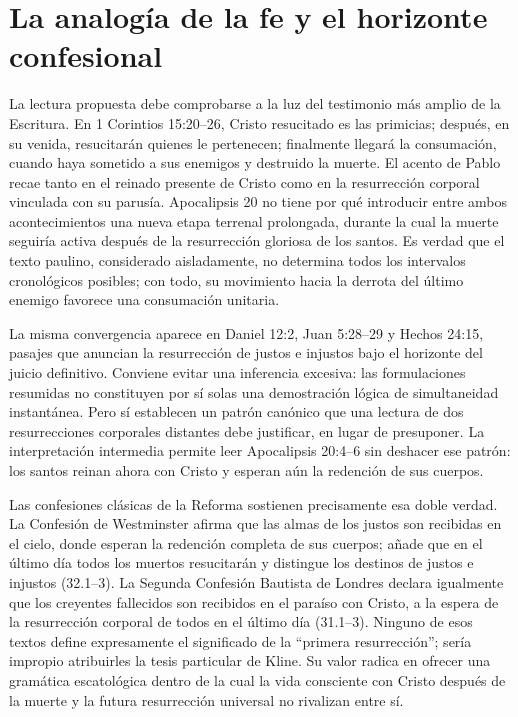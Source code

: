 \section{La analogía de la fe y el horizonte confesional}

La lectura propuesta debe comprobarse a la luz del testimonio más amplio de la Escritura.
En 1 Corintios 15:20--26, Cristo resucitado es las primicias; después, en su venida, resucitarán quienes le pertenecen; finalmente llegará la consumación, cuando haya sometido a sus enemigos y destruido la muerte.
El acento de Pablo recae tanto en el reinado presente de Cristo como en la resurrección corporal vinculada con su parusía.
Apocalipsis 20 no tiene por qué introducir entre ambos acontecimientos una nueva etapa terrenal prolongada, durante la cual la muerte seguiría activa después de la resurrección gloriosa de los santos.
Es verdad que el texto paulino, considerado aisladamente, no determina todos los intervalos cronológicos posibles; con todo, su movimiento hacia la derrota del último enemigo favorece una consumación unitaria. \autocite{johnson2024}

La misma convergencia aparece en Daniel 12:2, Juan 5:28--29 y Hechos 24:15, pasajes que anuncian la resurrección de justos e injustos bajo el horizonte del juicio definitivo.
Conviene evitar una inferencia excesiva: las formulaciones resumidas no constituyen por sí solas una demostración lógica de simultaneidad instantánea.
Pero sí establecen un patrón canónico que una lectura de dos resurrecciones corporales distantes debe justificar, en lugar de presuponer.
La interpretación intermedia permite leer Apocalipsis 20:4--6 sin deshacer ese patrón: los santos reinan ahora con Cristo y esperan aún la redención de sus cuerpos.

Las confesiones clásicas de la Reforma sostienen precisamente esa doble verdad.
La Confesión de Westminster afirma que las almas de los justos son recibidas en el cielo, donde esperan la redención completa de sus cuerpos; añade que en el último día todos los muertos resucitarán y distingue los destinos de justos e injustos (32.1--3). \autocite{westminster1647}
La Segunda Confesión Bautista de Londres declara igualmente que los creyentes fallecidos son recibidos en el paraíso con Cristo, a la espera de la resurrección corporal de todos en el último día (31.1--3). \autocite{baptist1689}
Ninguno de esos textos define expresamente el significado de la \enquote{primera resurrección}; sería impropio atribuirles la tesis particular de Kline.
Su valor radica en ofrecer una gramática escatológica dentro de la cual la vida consciente con Cristo después de la muerte y la futura resurrección universal no rivalizan entre sí.

